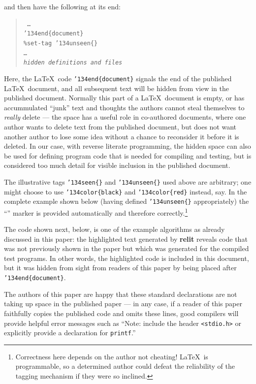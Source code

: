 \documentclass[12pt]{article}
\def\name#1{\textbf{#1}}
\begin{document}
and then have the following at its end:

\begin{verse}\tt
\ldots\\
\char'134end\{document\} \\
\%{}set-tag \char'134unseen\{\} \\
\ldots\\
\emph{hidden definitions and files}
\end{verse}

Here, the \LaTeX\ code \texttt{\char'134end\{document\}} signals the end of the published \LaTeX\ document, and all subsequent text will be hidden from view in the published document. Normally this part of a \LaTeX\ document is empty, or has accummulated ``junk'' text and thoughts the authors cannot steal themselves to \emph{really\/} delete --- the space has a useful role in co-authored documents, where one author wants to delete text from the published document, but does not want another author to lose some idea without a chance to reconsider it before it is deleted. In our case, with reverse literate programming, the hidden space can also be used for defining program code that is needed for compiling and testing, but is considered too much detail for visible inclusion in the published document.

The illustrative tags \texttt{\char'134seen\{\}} and \texttt{\char'134unseen\{\}} used above are arbitrary; one might choose to use \texttt{\char'134color\{black\}} and \texttt{\char'134color\{red\}} instead, say. In the complete example shown below (having defined \texttt{\char'134unseen\{\}} appropriately)  the ``{\hidden}'' marker is provided automatically and therefore correctly.\footnote{Correctness here depends on the author not cheating! \LaTeX\ is programmable, so a determined author could defeat the reliability of the tagging mechanism if they were so inclined.}

The code shown next, below, is one of the example algorithms as already discussed in this paper: the highlighted text generated by \name{relit} reveals code that was not previously shown in the paper but which was generated for the compiled test programs. In other words, the highlighted code is included in this document, but it was hidden from sight from readers of this paper by being placed after \texttt{\char'134end\{document\}}. 

The authors of this paper are happy that these standard declarations are not taking up space in the published paper --- in any case, if a reader of this paper faithfully copies the published code and omits these lines, good compilers will provide helpful error messages such as ``Note: include the header \texttt{<stdio.h>} or explicitly provide a declaration for \texttt{printf}.''
\end{document}
